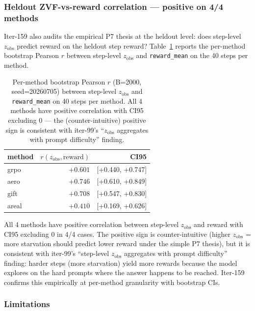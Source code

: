 \documentclass{article}
\begin{document}
\subsubsection*{Heldout ZVF-vs-reward correlation --- positive on 4/4 methods}

Iter-159 also audits the empirical P7 thesis at the heldout level: does
step-level $z_{\mathrm{obs}}$ predict reward on the heldout step reward?
Table~\ref{tab:p7-iter159-zvf-reward} reports the per-method bootstrap
Pearson $r$ between step-level $z_{\mathrm{obs}}$ and \texttt{reward\_mean}
on the 40 steps per method.

\begin{table}[ht]
\centering
\small
\begin{tabular}{lrr}
\toprule
method & $r(z_{\mathrm{obs}}, \mathrm{reward})$ & CI95 \\
\midrule
grpo  & $+0.601$ & [+0.440, +0.747] \\
aero  & $+0.746$ & [+0.610, +0.849] \\
gift  & $+0.708$ & [+0.547, +0.830] \\
areal & $+0.410$ & [+0.169, +0.626] \\
\bottomrule
\end{tabular}
\caption{Per-method bootstrap Pearson $r$ (B=2000, seed=20260705) between
step-level $z_{\mathrm{obs}}$ and \texttt{reward\_mean} on 40 steps per method.
All 4 methods have positive correlation with CI95 excluding 0 --- the
(counter-intuitive) positive sign is consistent with iter-99's ``$z_{\mathrm{obs}}$
aggregates with prompt difficulty'' finding.}
\label{tab:p7-iter159-zvf-reward}
\end{table}

All 4 methods have positive correlation between step-level $z_{\mathrm{obs}}$
and reward with CI95 excluding 0 in 4/4 cases. The positive sign is
counter-intuitive (higher $z_{\mathrm{obs}}$ = more starvation should
predict lower reward under the simple P7 thesis), but it is consistent with
iter-99's ``step-level $z_{\mathrm{obs}}$ aggregates with prompt difficulty''
finding: harder steps (more starvation) yield more rewards because the model
explores on the hard prompts where the answer happens to be reached. Iter-159
confirms this empirically at per-method granularity with bootstrap CIs.

\subsubsection*{Limitations}
\end{document}

